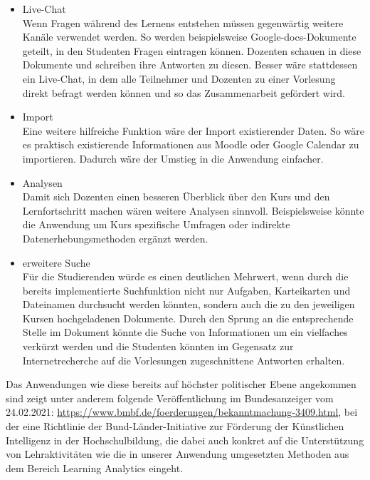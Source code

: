 \begin{itemize}
    \item Live-Chat\\
        Wenn Fragen während des Lernens entstehen müssen gegenwärtig weitere Kanäle verwendet werden.
        So werden beispielsweise Google-docs-Dokumente geteilt, in den Studenten Fragen eintragen können.
        Dozenten schauen in diese Dokumente und schreiben ihre Antworten zu diesen.
        Besser wäre stattdessen ein Live-Chat, in dem alle Teilnehmer und Dozenten zu einer Vorlesung direkt befragt werden können und so das Zusammenarbeit gefördert wird.
    \item Import\\
        Eine weitere hilfreiche Funktion wäre der Import existierender Daten.
        So wäre es praktisch existierende Informationen aus Moodle oder Google Calendar zu importieren.
        Dadurch wäre der Umstieg in die Anwendung einfacher. 
    \item Analysen\\
        Damit sich Dozenten einen besseren Überblick über den Kurs und den Lernfortschritt machen wären weitere Analysen sinnvoll.
        Beispielsweise könnte die Anwendung um Kurs spezifische Umfragen oder indirekte Datenerhebungsmethoden ergänzt werden.
    \item erweitere Suche\\
		Für die Studierenden würde es einen deutlichen Mehrwert, wenn durch die bereits implementierte Suchfunktion nicht nur Aufgaben, Karteikarten und Dateinamen durchsucht werden könnten, sondern auch die zu den jeweiligen Kursen hochgeladenen Dokumente. Durch den Sprung an die entsprechende Stelle im Dokument könnte die Suche von Informationen um ein vielfaches verkürzt werden und die Studenten könnten im Gegensatz zur Internetrecherche auf die Vorlesungen zugeschnittene Antworten erhalten.
\end{itemize}

Das Anwendungen wie diese bereits auf höchster politischer Ebene angekommen sind zeigt unter anderem folgende Veröffentlichung im Bundesanzeiger vom 24.02.2021: \url{https://www.bmbf.de/foerderungen/bekanntmachung-3409.html}, bei der eine Richtlinie der Bund-Länder-Initiative zur Förderung der Künstlichen Intelligenz in der Hochschulbildung, die dabei auch konkret auf die Unterstützung von Lehraktivitäten wie die in unserer Anwendung umgesetzten Methoden aus dem Bereich Learning Analytics eingeht. 
